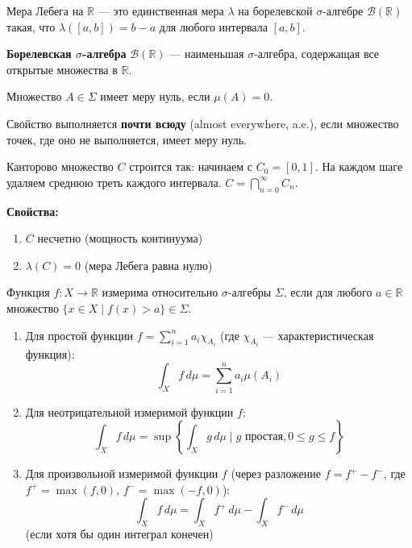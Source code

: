 \documentclass[11pt, a4paper]{extarticle}
\newcommand{\la}{\lambda}
\newcommand{\si}{\sigma}
\newcommand{\Si}{\Sigma}
\newcommand{\Bcal}{{\mathcal B}}
\newcommand{\R}{{\mathbb R}}
\renewcommand{\le}{\leqslant}
\begin{document}
\begin{definition}
Мера Лебега на $\R$ --- это единственная мера $\la$ на борелевской $\si$-алгебре $\Bcal(\R)$ такая, что $\la([a, b]) = b - a$ для любого интервала $[a, b]$.

\textbf{Борелевская $\si$-алгебра} $\Bcal(\R)$ --- наименьшая $\si$-алгебра, содержащая все открытые множества в $\R$.
\end{definition}

\begin{definition}
Множество $A \in \Si$ имеет меру нуль, если $\mu(A) = 0$.

Свойство выполняется \textbf{почти всюду} (almost everywhere, a.e.), если множество точек, где оно не выполняется, имеет меру нуль.
\end{definition}

\begin{theorem}
Канторово множество $C$ строится так: начинаем с $C_0 = [0, 1]$. На каждом шаге удаляем среднюю треть каждого интервала. $C = \bigcap_{n=0}^\infty C_n$.

\textbf{Свойства:}
\begin{enumerate}
    \item $C$ несчетно (мощность континуума)
    \item $\la(C) = 0$ (мера Лебега равна нулю)
\end{enumerate}
\end{theorem}

\begin{definition}
Функция $f: X \to \R$ измерима относительно $\si$-алгебры $\Si$, если для любого $a \in \R$ множество $\{x \in X \mid f(x) > a\} \in \Si$.
\end{definition}

\begin{definition}\;
\begin{enumerate}
    \item Для простой функции $f = \sum_{i=1}^n a_i \chi_{A_i}$ (где $\chi_{A_i}$ --- характеристическая функция): 
    $$\int_X f \, d\mu = \sum_{i=1}^n a_i \mu(A_i)$$
    \item Для неотрицательной измеримой функции $f$:
    $$\int_X f \, d\mu = \sup\left\{\int_X g \, d\mu \mid g \text{ простая}, 0 \le g \le f\right\}$$
    \item Для произвольной измеримой функции $f$ (через разложение $f = f^+ - f^-$, где $f^+ = \max(f, 0)$, $f^- = \max(-f, 0)$):
    $$\int_X f \, d\mu = \int_X f^+ \, d\mu - \int_X f^- \, d\mu$$
    (если хотя бы один интеграл конечен)
\end{enumerate}
\end{definition}
\end{document}
